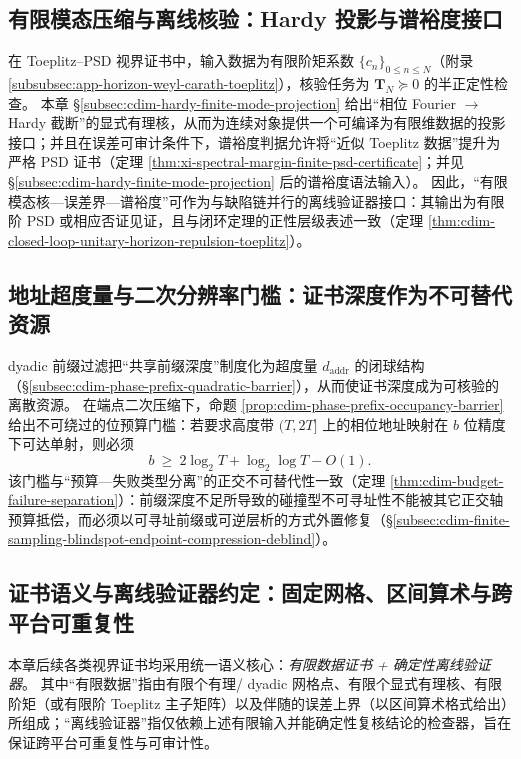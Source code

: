 \subsection{有限模态压缩与离线核验：Hardy 投影与谱裕度接口}\label{subsec:cdim-hardy-toeplitz-offline-verifier}
在 Toeplitz--PSD 视界证书中，输入数据为有限阶矩系数 \(\{c_n\}_{0\le n\le N}\)（附录 \ref{subsubsec:app-horizon-weyl-carath-toeplitz}），核验任务为 \(\mathbf{T}_N\succeq 0\) 的半正定性检查。
本章 \S\ref{subsec:cdim-hardy-finite-mode-projection} 给出“相位 Fourier \(\to\) Hardy 截断”的显式有理核，从而为连续对象提供一个可编译为有限维数据的投影接口；并且在误差可审计条件下，谱裕度判据允许将“近似 Toeplitz 数据”提升为严格 PSD 证书（定理 \ref{thm:xi-spectral-margin-finite-psd-certificate}；并见 \S\ref{subsec:cdim-hardy-finite-mode-projection} 后的谱裕度语法输入）。
因此，“有限模态核—误差界—谱裕度”可作为与缺陷链并行的离线验证器接口：其输出为有限阶 PSD 或相应否证见证，且与闭环定理的正性层级表述一致（定理 \ref{thm:cdim-closed-loop-unitary-horizon-repulsion-toeplitz}）。

\subsection{地址超度量与二次分辨率门槛：证书深度作为不可替代资源}\label{subsec:cdim-address-ultrametric-budget-irreplaceable}
dyadic 前缀过滤把“共享前缀深度”制度化为超度量 \(d_{\mathrm{addr}}\) 的闭球结构（\S\ref{subsec:cdim-phase-prefix-quadratic-barrier}），从而使证书深度成为可核验的离散资源。
在端点二次压缩下，命题 \ref{prop:cdim-phase-prefix-occupancy-barrier} 给出不可绕过的位预算门槛：若要求高度带 \((T,2T]\) 上的相位地址映射在 \(b\) 位精度下可达单射，则必须
\[
b\ \ge\ 2\log_2 T+\log_2\log T-O(1).
\]
该门槛与“预算—失败类型分离”的正交不可替代性一致（定理 \ref{thm:cdim-budget-failure-separation}）：前缀深度不足所导致的碰撞型不可寻址性不能被其它正交轴预算抵偿，而必须以可寻址前缀或可逆层析的方式外置修复（\S\ref{subsec:cdim-finite-sampling-blindspot-endpoint-compression-deblind}）。

\subsection{证书语义与离线验证器约定：固定网格、区间算术与跨平台可重复性}\label{subsec:cdim-certificate-semantics-offline-verifier-conventions}
本章后续各类视界证书均采用统一语义核心：\emph{有限数据证书 + 确定性离线验证器}。
其中“有限数据”指由有限个有理/ dyadic 网格点、有限个显式有理核、有限阶矩（或有限阶 Toeplitz 主子矩阵）以及伴随的误差上界（以区间算术格式给出）所组成；“离线验证器”指仅依赖上述有限输入并能确定性复核结论的检查器，旨在保证跨平台可重复性与可审计性。

